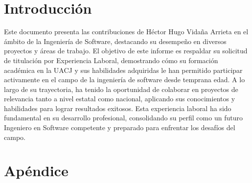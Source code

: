 \documentclass[final, fmstyle, 12pt]{article}
\begin{document}
\section{Introducción}
Este documento presenta las contribuciones de Héctor Hugo Vidaña Arrieta en el ámbito de
la Ingeniería de Software, destacando su desempeño en diversos proyectos y áreas de
trabajo. El objetivo de este informe es respaldar su solicitud de titulación por Experiencia
Laboral, demostrando cómo su formación académica en la UACJ y sus habilidades
adquiridas le han permitido participar activamente en el campo de la ingeniería de software
desde temprana edad. A lo largo de su trayectoria, ha tenido la oportunidad de colaborar en
proyectos de relevancia tanto a nivel estatal como nacional, aplicando sus conocimientos y
habilidades para lograr resultados exitosos. Esta experiencia laboral ha sido fundamental en
su desarrollo profesional, consolidando su perfil como un futuro Ingeniero en Software
competente y preparado para enfrentar los desafíos del campo.









\newpage

% 


\clearpage
\appendix

\section{Apéndice}
\end{document}
